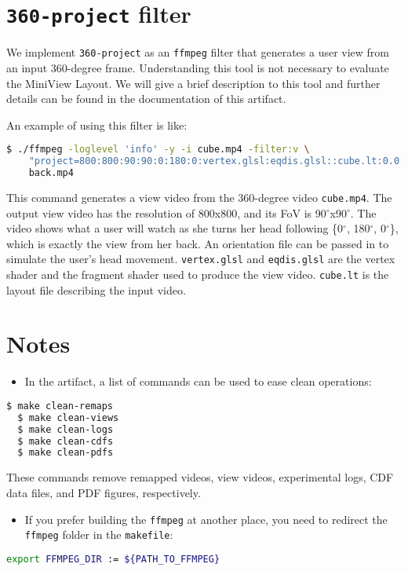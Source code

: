 \section{{\tt 360-project} filter}
\label{sec:filter}
We implement {\tt 360-project} as an {\tt ffmpeg} filter that generates a user view from an input 360-degree
frame. Understanding this tool is not necessary to evaluate the MiniView Layout. We will give a brief description to
this tool and further details can be found in the documentation of this artifact.

An example of using this filter is like:
\begin{lstlisting}[language=bash, numbers=none, morekeywords={make, git, clone}, deletekeywords={enable}, basicstyle=\ttfamily\tiny]
  $ ./ffmpeg -loglevel 'info' -y -i cube.mp4 -filter:v \
    "project=800:800:90:90:0:180:0:vertex.glsl:eqdis.glsl::cube.lt:0.0:1.0" \
    back.mp4
\end{lstlisting}
This command generates a view video from the 360-degree video {\tt cube.mp4}. The output view video has the resolution
of 800x800, and its FoV is 90$^{\circ}$x90$^{\circ}$. The video shows what a user will watch as she turns her head
following \{0$^{\circ}$, 180$^{\circ}$, 0$^{\circ}$\}, which is exactly the view from her back. An orientation file can
be passed in to simulate the user's head movement. {\tt vertex.glsl} and {\tt eqdis.glsl} are the vertex shader and the
fragment shader used to produce the view video. {\tt cube.lt} is the layout file describing the input video.


\section{Notes}
\label{sec:notes}
\begin{itemize}[leftmargin=*]
\item In the artifact, a list of commands can be used to ease clean operations:
\end{itemize}
\begin{lstlisting}[language=bash, numbers=none]
  $ make clean-remaps
  $ make clean-views
  $ make clean-logs
  $ make clean-cdfs
  $ make clean-pdfs
\end{lstlisting}
These commands remove remapped videos, view videos, experimental logs, CDF data files, and PDF figures,
respectively.

\begin{itemize}[leftmargin=*]
\item If you prefer building the {\tt ffmpeg} at another place, you need to redirect the {\tt ffmpeg} folder in the
  {\tt makefile}:
\end{itemize}
\begin{lstlisting}[language=bash, numbers=none]
  export FFMPEG_DIR := ${PATH_TO_FFMPEG}
\end{lstlisting}


